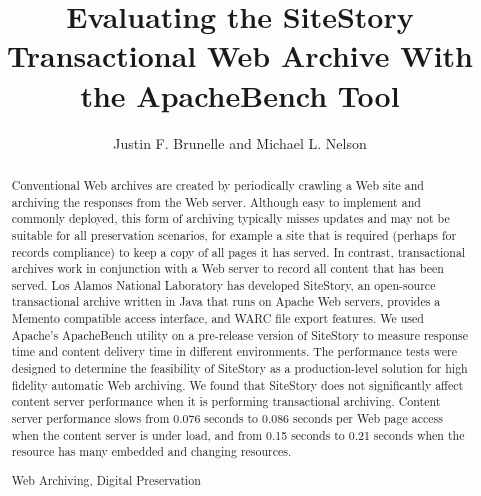 \documentclass[runningheads,a4paper]{llncs}
\newcommand{\keywords}[1]{\par\addvspace\baselineskip
\noindent\keywordname\enspace\ignorespaces#1}
\begin{document}
\mainmatter

\title{Evaluating the SiteStory Transactional Web Archive With the ApacheBench Tool}

\author{Justin F. Brunelle and Michael L. Nelson}


%
%

\maketitle


\begin{abstract}
\sloppy Conventional Web archives are created by periodically crawling a Web
site and archiving the responses from the Web server.  Although easy to
implement and commonly deployed, this form of archiving typically misses
updates and  may not be suitable for all preservation scenarios, for
example a site that is required (perhaps for records compliance) to keep
a copy of all pages it has served.  In contrast, transactional archives
work in conjunction with a Web server to record all content that has
been served.  Los Alamos National Laboratory has developed SiteStory, an
open-source transactional archive written in Java that
runs on Apache Web servers, provides a Memento compatible access
interface, and WARC file export features. We used Apache's ApacheBench
utility on a pre-release version of SiteStory to measure response time and
content delivery time in different environments. 
The performance tests were designed to determine the
feasibility of SiteStory as a production-level solution for high
fidelity automatic Web archiving.  We found that SiteStory does not
significantly affect content server performance when it is performing
transactional archiving.  Content server performance slows from 0.076
seconds to 0.086 seconds per Web page access when the content server is
under load, and from 0.15 seconds to 0.21 seconds when the resource has
many embedded and changing resources.\fussy

\keywords{Web Archiving, Digital Preservation}
\end{abstract}
\end{document}
